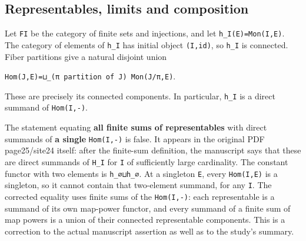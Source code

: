\documentclass[
  10pt,
]{article}
\begin{document}
\subsection{Representables, limits and
composition}\label{representables-limits-and-composition}

Let \texttt{\small FI} be the category of finite sets and injections,
and let
\texttt{\small h\_\allowbreak{}I(\allowbreak{}E)\allowbreak{}=\allowbreak{}Mon(\allowbreak{}I,\allowbreak{}E)\allowbreak{}}.
The category of elements of \texttt{\small h\_\allowbreak{}I} has
initial object
\texttt{\small (\allowbreak{}I,\allowbreak{}id)\allowbreak{}}, so
\texttt{\small h\_\allowbreak{}I} is connected. Fiber partitions give a
natural disjoint union

\texttt{\small Hom(\allowbreak{}J,\allowbreak{}E)\allowbreak{}=\allowbreak{}⊔\_\allowbreak{}(\allowbreak{}π partition of J)\allowbreak{} Mon(\allowbreak{}J/\allowbreak{}π,\allowbreak{}E)\allowbreak{}}.

These are precisely its connected components. In particular,
\texttt{\small h\_\allowbreak{}I} is a direct summand of
\texttt{\small Hom(\allowbreak{}I,\allowbreak{}-\allowbreak{})\allowbreak{}}.

The statement equating \textbf{all finite sums of representables} with
direct summands of \textbf{a single}
\texttt{\small Hom(\allowbreak{}I,\allowbreak{}-\allowbreak{})\allowbreak{}}
is false. It appears in the original PDF page25/site24 itself: after the
finite-sum definition, the manuscript says that these are direct
summands of \texttt{\small H\_\allowbreak{}I} for \texttt{\small I} of
sufficiently large cardinality. The constant functor with two elements
is \texttt{\small h\_\allowbreak{}∅⊔h\_\allowbreak{}∅}. At a singleton
\texttt{\small E}, every
\texttt{\small Hom(\allowbreak{}I,\allowbreak{}E)\allowbreak{}} is a
singleton, so it cannot contain that two-element summand, for any
\texttt{\small I}. The corrected equality uses finite sums of the
\texttt{\small Hom(\allowbreak{}I,\allowbreak{}-\allowbreak{})\allowbreak{}}:
each representable is a summand of its own map-power functor, and every
summand of a finite sum of map powers is a union of their connected
representable components. This is a correction to the actual manuscript
assertion as well as to the study's summary.
\end{document}
